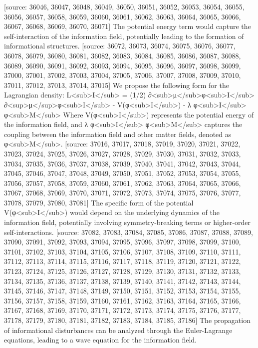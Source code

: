 \documentclass[12pt]{article}
\begin{document}
[source: 36046, 36047, 36048, 36049, 36050, 36051, 36052, 36053, 36054, 36055, 36056, 36057, 36058, 36059, 36060, 36061, 36062, 36063, 36064, 36065, 36066, 36067, 36068, 36069, 36070, 36071] The potential energy term would capture the self-interaction of the information field, potentially leading to the formation of informational structures.
[source: 36072, 36073, 36074, 36075, 36076, 36077, 36078, 36079, 36080, 36081, 36082, 36083, 36084, 36085, 36086, 36087, 36088, 36089, 36090, 36091, 36092, 36093, 36094, 36095, 36096, 36097, 36098, 36099, 37000, 37001, 37002, 37003, 37004, 37005, 37006, 37007, 37008, 37009, 37010, 37011, 37012, 37013, 37014, 37015] We propose the following form for the Lagrangian density:
L<sub>I</sub> = (1/2) ∂<sub>μ</sub>φ<sub>I</sub> ∂<sup>μ</sup>φ<sub>I</sub> - V(φ<sub>I</sub>) - λ φ<sub>I</sub> φ<sub>M</sub>
Where V(φ<sub>I</sub>) represents the potential energy of the information field, and λ φ<sub>I</sub> φ<sub>M</sub> captures the coupling between the information field and other matter fields, denoted as φ<sub>M</sub>.
[source: 37016, 37017, 37018, 37019, 37020, 37021, 37022, 37023, 37024, 37025, 37026, 37027, 37028, 37029, 37030, 37031, 37032, 37033, 37034, 37035, 37036, 37037, 37038, 37039, 37040, 37041, 37042, 37043, 37044, 37045, 37046, 37047, 37048, 37049, 37050, 37051, 37052, 37053, 37054, 37055, 37056, 37057, 37058, 37059, 37060, 37061, 37062, 37063, 37064, 37065, 37066, 37067, 37068, 37069, 37070, 37071, 37072, 37073, 37074, 37075, 37076, 37077, 37078, 37079, 37080, 37081] The specific form of the potential V(φ<sub>I</sub>) would depend on the underlying dynamics of the information field, potentially involving symmetry-breaking terms or higher-order self-interactions.
[source: 37082, 37083, 37084, 37085, 37086, 37087, 37088, 37089, 37090, 37091, 37092, 37093, 37094, 37095, 37096, 37097, 37098, 37099, 37100, 37101, 37102, 37103, 37104, 37105, 37106, 37107, 37108, 37109, 37110, 37111, 37112, 37113, 37114, 37115, 37116, 37117, 37118, 37119, 37120, 37121, 37122, 37123, 37124, 37125, 37126, 37127, 37128, 37129, 37130, 37131, 37132, 37133, 37134, 37135, 37136, 37137, 37138, 37139, 37140, 37141, 37142, 37143, 37144, 37145, 37146, 37147, 37148, 37149, 37150, 37151, 37152, 37153, 37154, 37155, 37156, 37157, 37158, 37159, 37160, 37161, 37162, 37163, 37164, 37165, 37166, 37167, 37168, 37169, 37170, 37171, 37172, 37173, 37174, 37175, 37176, 37177, 37178, 37179, 37180, 37181, 37182, 37183, 37184, 37185, 37186] The propagation of informational disturbances can be analyzed through the Euler-Lagrange equations, leading to a wave equation for the information field.
\end{document}
